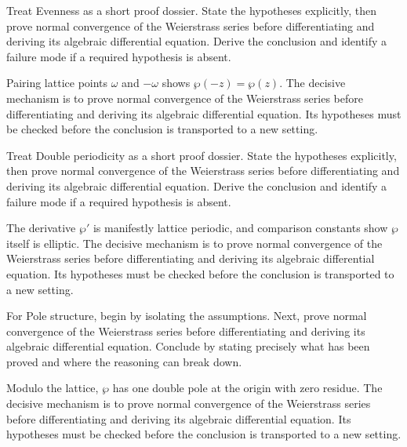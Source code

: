 \begin{problem}\label{prob:iv29-problem-03}
Treat Evenness as a short proof dossier. State the hypotheses explicitly, then prove normal convergence of the Weierstrass series before differentiating and deriving its algebraic differential equation. Derive the conclusion and identify a failure mode if a required hypothesis is absent.
\end{problem}
\begin{solution}
Pairing lattice points $\omega$ and $-\omega$ shows $\wp(-z)=\wp(z)$. The decisive mechanism is to prove normal convergence of the Weierstrass series before differentiating and deriving its algebraic differential equation. Its hypotheses must be checked before the conclusion is transported to a new setting.
\end{solution}

\begin{problem}\label{prob:iv29-problem-04}
Treat Double periodicity as a short proof dossier. State the hypotheses explicitly, then prove normal convergence of the Weierstrass series before differentiating and deriving its algebraic differential equation. Derive the conclusion and identify a failure mode if a required hypothesis is absent.
\end{problem}
\begin{solution}
The derivative $\wp'$ is manifestly lattice periodic, and comparison constants show $\wp$ itself is elliptic. The decisive mechanism is to prove normal convergence of the Weierstrass series before differentiating and deriving its algebraic differential equation. Its hypotheses must be checked before the conclusion is transported to a new setting.
\end{solution}

\begin{problem}\label{prob:iv29-problem-05}
For Pole structure, begin by isolating the assumptions. Next, prove normal convergence of the Weierstrass series before differentiating and deriving its algebraic differential equation. Conclude by stating precisely what has been proved and where the reasoning can break down.
\end{problem}
\begin{solution}
Modulo the lattice, $\wp$ has one double pole at the origin with zero residue. The decisive mechanism is to prove normal convergence of the Weierstrass series before differentiating and deriving its algebraic differential equation. Its hypotheses must be checked before the conclusion is transported to a new setting.
\end{solution}

